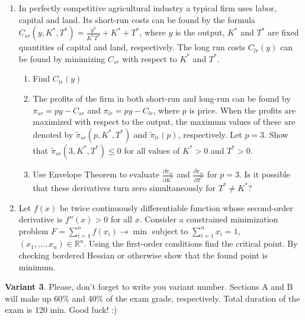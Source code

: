 \documentclass[12pt,a4paper]{article}
\begin{document}
\begin{enumerate}[resume]
\item In perfectly competitive agricultural industry a typical firm uses labor, capital and land. Its short-run costs can be found by the formula $C_{sr}(y,K^*,T^*)=\frac{y^3}{K^*T^*}+K^*+T^*$, where $y$  is the output, $K^*$  and $T^*$  are fixed quantities of capital and land, respectively.
The long run costs $C_{lr}(y)$ can be found by minimizing $C_{sr}$ with respect to $K^*$  and $T^*$.
\begin{enumerate} 
\item Find  $C_{lr}(y)$
\item The profits of the firm in both short-run and long-run can be found by $\pi_{sr}=py-C_{sr}$  and   $\pi_{lr}=py-C_{lr}$, where $p$ is price. When the profits are maximized with respect to the output, the maximum values of these are denoted by $\tilde{\pi}_{sr}(p,K^*,T^*)$ and $\tilde{\pi}_{lr}(p)$, respectively. Let $p=3$. Show that $\tilde{\pi}_{sr}(3,K^*,T^*) \leq 0$ for all values of  $K^*>0$  and  $T^*>0$. 
\item Use Envelope Theorem to evaluate $\frac{\partial \tilde{\pi}_{sr}}{\partial K^*}$ and $\frac{\partial \tilde{\pi}_{sr}}{\partial T^*}$ for $p=3$. Is it possible that these derivatives turn zero simultaneously for $T^* \neq K^*$?
\end{enumerate}

\item Let $f(x)$ be twice continuously differentiable function whose second-order derivative is $f''(x)>0$ for all $x$. Consider a constrained minimization problem $F=\sum_{i=1}^n f(x_i) \to \min$ 
subject to $\sum_{i=1}^n x_i = 1$,  $(x_1, \ldots, x_n)\in \mathbb{R}^n$. Using the first-order conditions find the critical point. By checking bordered Hessian or otherwise show that the found point is minimum.
\end{enumerate}

\newpage
\thispagestyle{empty}
\textbf{Variant 3}. Please, don't forget to write you variant number. Sections A and B will make up 60\% and 40\% of the exam grade, respectively. Total duration of the exam is 120 min. Good luck! :) 
\end{document}
